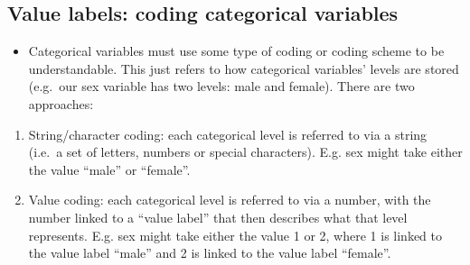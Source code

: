 \documentclass[
]{book}
\providecommand{\tightlist}{%
  \setlength{\itemsep}{0pt}\setlength{\parskip}{0pt}}
\begin{document}
\hypertarget{value-labels-coding-categorical-variables}{%
\subsection{Value labels: coding categorical variables}\label{value-labels-coding-categorical-variables}}

\begin{itemize}
\tightlist
\item
  Categorical variables must use some type of coding or coding scheme to be understandable. This just refers to how categorical variables' levels are stored (e.g.~our sex variable has two levels: male and female). There are two approaches:
\end{itemize}

\begin{enumerate}
\def\labelenumi{\arabic{enumi}.}
\item
  String/character coding: each categorical level is referred to via a string (i.e.~a set of letters, numbers or special characters). E.g. sex might take either the value ``male'' or ``female''.
\item
  Value coding: each categorical level is referred to via a number, with the number linked to a ``value label'' that then describes what that level represents. E.g. sex might take either the value 1 or 2, where 1 is linked to the value label ``male'' and 2 is linked to the value label ``female''.
\end{enumerate}
\end{document}
